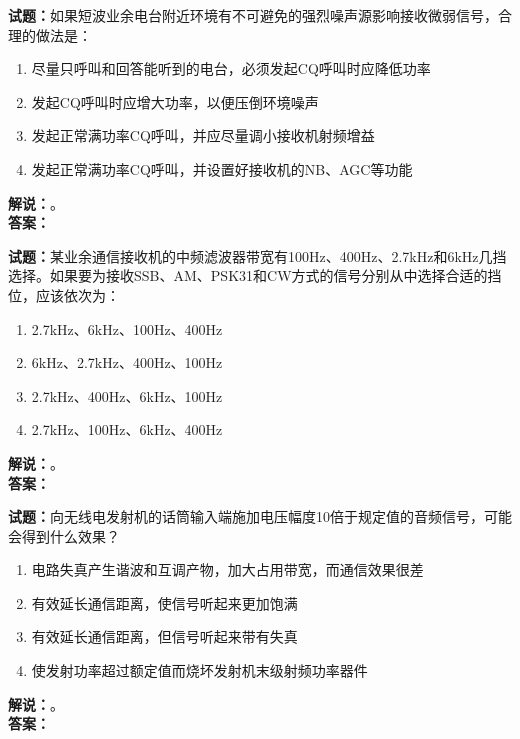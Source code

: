 \documentclass{ctexbook}
\begin{document}
\noindent\textbf{试题：}如果短波业余电台附近环境有不可避免的强烈噪声源影响接收微弱信号，合理的做法是：
\begin{enumerate}[leftmargin=3em]
\item 尽量只呼叫和回答能听到的电台，必须发起CQ呼叫时应降低功率
\item 发起CQ呼叫时应增大功率，以便压倒环境噪声
\item 发起正常满功率CQ呼叫，并应尽量调小接收机射频增益
\item 发起正常满功率CQ呼叫，并设置好接收机的NB、AGC等功能
\end{enumerate}
\noindent\textbf{解说：}\textbf{}。\\\noindent\textbf{答案：}

\bigskip




\noindent\textbf{试题：}某业余通信接收机的中频滤波器带宽有100Hz、400Hz、2.7\unit{\kHz}和6\unit{\kHz}几挡选择。如果要为接收SSB、AM、PSK31和CW方式的信号分别从中选择合适的挡位，应该依次为：
\begin{enumerate}[leftmargin=3em]
\item 2.7\unit{\kHz}、6\unit{\kHz}、100Hz、400Hz
\item 6\unit{\kHz}、2.7\unit{\kHz}、400Hz、100Hz
\item 2.7\unit{\kHz}、400Hz、6\unit{\kHz}、100Hz
\item 2.7\unit{\kHz}、100Hz、6\unit{\kHz}、400Hz
\end{enumerate}
\noindent\textbf{解说：}\textbf{}。\\\noindent\textbf{答案：}

\bigskip




\noindent\textbf{试题：}向无线电发射机的话筒输入端施加电压幅度10倍于规定值的音频信号，可能会得到什么效果？
\begin{enumerate}[leftmargin=3em]
\item 电路失真产生谐波和互调产物，加大占用带宽，而通信效果很差
\item 有效延长通信距离，使信号听起来更加饱满
\item 有效延长通信距离，但信号听起来带有失真
\item 使发射功率超过额定值而烧坏发射机末级射频功率器件
\end{enumerate}
\noindent\textbf{解说：}\textbf{}。\\\noindent\textbf{答案：}

\bigskip
\end{document}
